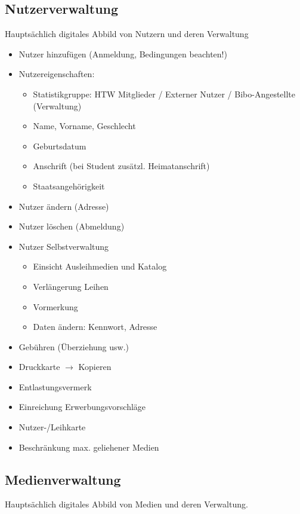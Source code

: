 \subsection{Nutzerverwaltung}
Hauptsächlich digitales Abbild von Nutzern und deren Verwaltung
\begin{itemize}
\item Nutzer hinzufügen (Anmeldung, Bedingungen beachten!)
\item Nutzereigenschaften:
\begin{itemize}
\item Statistikgruppe: HTW Mitglieder / Externer Nutzer / Bibo-Angestellte (Verwaltung)
\item Name, Vorname, Geschlecht
\item Geburtsdatum
\item Anschrift (bei Student zusätzl. Heimatanschrift)
\item Staatsangehörigkeit
\end{itemize}
\item Nutzer ändern (Adresse)
\item Nutzer löschen (Abmeldung)
\item Nutzer Selbstverwaltung 
\begin{itemize}
\item Einsicht Ausleihmedien und Katalog
\item Verlängerung Leihen
\item Vormerkung
\item Daten ändern: Kennwort, Adresse
\end{itemize}
\item Gebühren (Überziehung usw.)
\item Druckkarte $\to$ Kopieren
\item Entlastungsvermerk
\item Einreichung Erwerbungsvorschläge
\item Nutzer-/Leihkarte
\item Beschränkung max. geliehener Medien
\end{itemize}

\subsection{Medienverwaltung}
Hauptsächlich digitales Abbild von Medien und deren Verwaltung.

